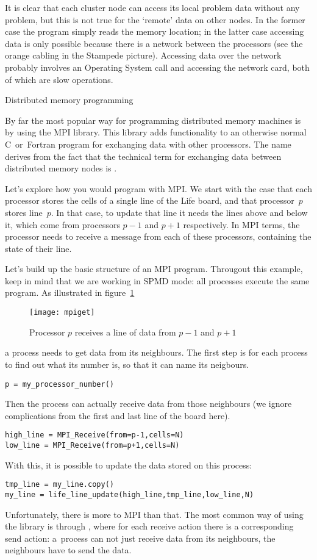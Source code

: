 It is clear that each cluster node can access its local
problem data without any problem, but this is not true for the `remote' data
on other nodes.
In the former case the program simply reads the memory location;
in the latter case accessing data is only possible because there is a network
between the processors (see the orange cabling in the Stampede picture).
Accessing data over the network
probably involves an Operating System call and accessing
the network card, both of which are slow operations.

 {Distributed memory programming}
\label{sec:mpi}

By far the most popular way for programming distributed memory
machines is by using the \acf{MPI} library. This library adds
functionality to an otherwise normal C~or~Fortran program for
exchanging data with other processors. The name derives
from the fact that the technical term for
exchanging data between distributed memory nodes
is .

Let's explore how you would program with MPI.
We start with the case that each processor stores the cells
of a single line of the Life board, and that processor~$p$ stores line~$p$.
In that case, to update that line
it needs the lines above and below it, which come from processors $p-1$ and $p+1$
respectively. In MPI terms, the processor needs to receive a message
from each of these processors, containing the state of their line.

Let's build up the basic structure of an MPI program. 
Througout this example, keep in mind that we are working in \ac{SPMD} mode:
all processes execute the same program.
As illustrated in figure~\ref{fig:mpiget}
\begin{figure}[ht]
  \texttt{[image: mpiget]}
  \caption{Processor $p$ receives a line of data from $p-1$ and $p+1$}
  \label{fig:mpiget}
\end{figure}
a process needs to get data from its neighbours. 
The first step is for each process to find out what its number is,
so that it can name its neigbours.
\begin{verbatim}
p = my_processor_number()
\end{verbatim}
Then the process can actually receive data from those neighbours
(we ignore complications from the first and last line of the board here).
\begin{verbatim}
high_line = MPI_Receive(from=p-1,cells=N)
low_line = MPI_Receive(from=p+1,cells=N)
\end{verbatim}
With this, it is possible to update the data stored on this process:
\begin{verbatim}
tmp_line = my_line.copy()
my_line = life_line_update(high_line,tmp_line,low_line,N)
\end{verbatim}
Unfortunately, there is more to MPI than that. The most common way
of using the library is through ,
where for each receive action there is a corresponding send action:
a~process can not just receive data from its neighbours, the neighbours
have to send the data.

